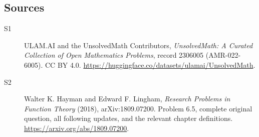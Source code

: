 \documentclass[11pt]{book}
\begin{document}
\subsection{Sources}
\begin{description}
\item[\hypertarget{source:2306005:1}{S1}] ULAM.AI and the UnsolvedMath Contributors, \emph{UnsolvedMath: A Curated Collection of Open Mathematics Problems}, record 2306005 (AMR-022-6005). CC BY 4.0. \url{https://huggingface.co/datasets/ulamai/UnsolvedMath}.
\item[\hypertarget{source:2306005:2}{S2}] Walter K. Hayman and Edward F. Lingham, \emph{Research Problems in Function Theory} (2018), arXiv:1809.07200. Problem 6.5, complete original question, all following updates, and the relevant chapter definitions. \url{https://arxiv.org/abs/1809.07200}.
\end{description}
\label{end:2306005}
\end{document}
